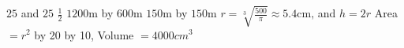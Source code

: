 \begin{Answer}[ref={exOptimisation}]
\Question %
$25$ and $25$
\Question %
$\frac{1}{2}$ 
\Question %
$1200 \mbox{m}$ by $600 \mbox{m}$
\Question %
$150 \mbox{m}$ by $150 \mbox{m}$ 
\Question %
$r =\sqrt[{3}]{\frac{500}{\pi }} \approx 5.4 \mbox{cm}\text{,}$ and $h =2 r$ 
\Question %
 Area $ =r^{2}$ 
 by 20 by 10, Volume $ =4000 cm^{3}$ 	
\end{Answer}%